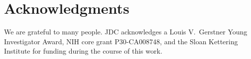 \documentclass[aps,pre,twocolumn,nofootinbib,superscriptaddress,linenumbers,11point]{revtex4-1}
\begin{document}

\section*{Acknowledgments}

We are grateful to many people.
JDC acknowledges a Louis V.~Gerstner Young Investigator Award, NIH core grant P30-CA008748, and the Sloan Kettering Institute for funding during the course of this work.


 

\end{document}
